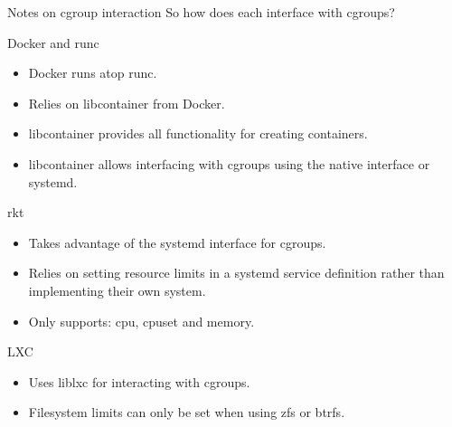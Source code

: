 \begin{frame}[fragile]{Notes on cgroup interaction}
So how does each interface with cgroups?
\begin{block}{Docker and runc}
\begin{itemize}
\tiny
\item Docker runs atop runc.
\item Relies on libcontainer from Docker.
\item libcontainer provides all functionality for creating containers.
\item libcontainer allows interfacing with cgroups using the native interface or systemd.
\end{itemize}
\end{block}

\begin{block}{rkt}
\tiny
\begin{itemize}
\item Takes advantage of the systemd interface for cgroups. 
\item Relies on setting resource limits in a systemd service definition rather than implementing their own system. 
\item Only supports: cpu, cpuset and memory. 
\end{itemize}
\end{block}

\begin{block}{LXC}
\begin{itemize}
\tiny
\item Uses liblxc for interacting with cgroups.
\item Filesystem limits can only be set when using zfs or btrfs. 
\end{itemize}
\end{block}

\end{frame}